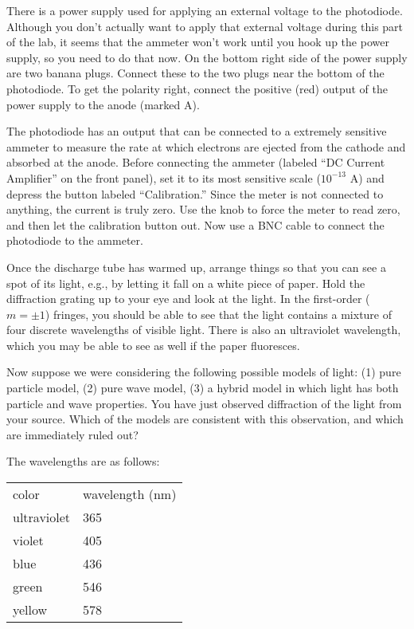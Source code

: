There is a power supply used for applying an external voltage to the photodiode. Although you don't
actually want to apply that external voltage during this part of the lab, it seems that the ammeter
won't work until you hook up the power supply, so you need to do that now.
On the bottom right side of the power supply are two banana plugs. Connect these to the
two plugs near the bottom of the photodiode. To get the polarity right, connect the 
positive (red) output of the power supply to the anode (marked A).

The photodiode has an output that can be connected to a extremely sensitive ammeter to measure the
rate at which electrons are ejected from the cathode and absorbed at the anode. Before connecting the
ammeter (labeled ``DC Current Amplifier'' on the front panel), set it to its most sensitive scale
($10^{-13}$ A) and depress the button labeled ``Calibration.'' Since the meter is not connected to anything,
the current is truly zero. Use the knob to force the meter to read zero, and then let the calibration button out.
Now use a BNC cable to connect the photodiode to the ammeter.

Once the discharge tube has warmed up, arrange things so that you can see a spot of its light, e.g., by
letting it fall on a white piece of paper. Hold the diffraction grating up to your eye and look at the
light. In the first-order ($m=\pm1$) fringes, you should be able to see that the light contains a
mixture of four discrete wavelengths of visible light. There is also an ultraviolet wavelength,
which you may be able to see as well if the paper fluoresces.

Now suppose we were considering the following possible models of light: (1) pure particle model,
(2) pure wave model, (3) a hybrid model in which light has both particle and
wave properties. You have just observed diffraction of the light
from your source. Which of the models are consistent with this observation, and which are immediately
ruled out?

The wavelengths are as follows:\label{hg-wavelengths}

\begin{tabular}{ll}
color   &wavelength (nm)\\
ultraviolet &  365\\
violet   &405\\
blue   &436\\
green  & 546\\
yellow  & 578 
\end{tabular}

